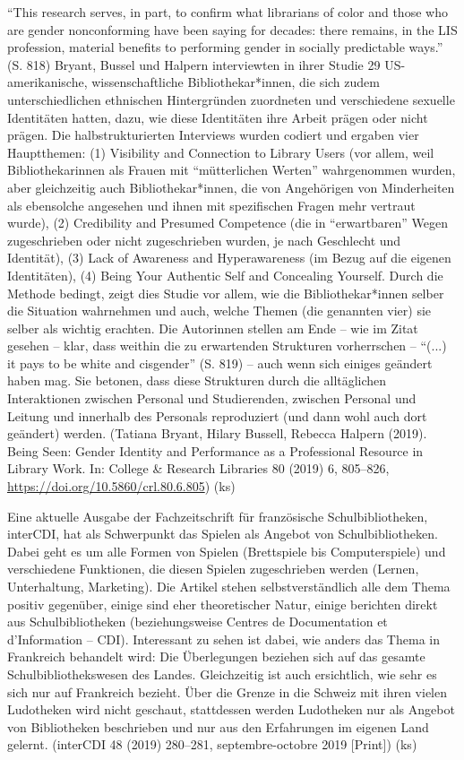 \documentclass[a4paper,
fontsize=11pt,
oneside,
numbers=noperiodatend,
parskip=half-,
bibliography=totoc,
final
]{scrartcl}
\begin{document}
\enquote{This research serves, in part, to confirm what librarians of
color and those who are gender nonconforming have been saying for
decades: there remains, in the LIS profession, material benefits to
performing gender in socially predictable ways.} (S. 818) Bryant, Bussel
und Halpern interviewten in ihrer Studie 29 US-amerikanische,
wissenschaftliche Bibliothekar*innen, die sich zudem unterschiedlichen
ethnischen Hintergründen zuordneten und verschiedene sexuelle
Identitäten hatten, dazu, wie diese Identitäten ihre Arbeit prägen oder
nicht prägen. Die halbstrukturierten Interviews wurden codiert und
ergaben vier Hauptthemen: (1) Visibility and Connection to Library Users
(vor allem, weil Bibliothekarinnen als Frauen mit \enquote{mütterlichen
Werten} wahrgenommen wurden, aber gleichzeitig auch Bibliothekar*innen,
die von Angehörigen von Minderheiten als ebensolche angesehen und ihnen
mit spezifischen Fragen mehr vertraut wurde), (2) Credibility and
Presumed Competence (die in \enquote{erwartbaren} Wegen zugeschrieben
oder nicht zugeschrieben wurden, je nach Geschlecht und Identität), (3)
Lack of Awareness and Hyperawareness (im Bezug auf die eigenen
Identitäten), (4) Being Your Authentic Self and Concealing Yourself.
Durch die Methode bedingt, zeigt dies Studie vor allem, wie die
Bibliothekar*innen selber die Situation wahrnehmen und auch, welche
Themen (die genannten vier) sie selber als wichtig erachten. Die
Autorinnen stellen am Ende -- wie im Zitat gesehen -- klar, dass weithin
die zu erwartenden Strukturen vorherrschen -- \enquote{(...) it pays to
be white and cisgender} (S. 819) -- auch wenn sich einiges geändert
haben mag. Sie betonen, dass diese Strukturen durch die alltäglichen
Interaktionen zwischen Personal und Studierenden, zwischen Personal und
Leitung und innerhalb des Personals reproduziert (und dann wohl auch
dort geändert) werden. (Tatiana Bryant, Hilary Bussell, Rebecca Halpern
(2019). Being Seen: Gender Identity and Performance as a Professional
Resource in Library Work. In: College \& Research Libraries 80 (2019) 6,
805--826, \url{https://doi.org/10.5860/crl.80.6.805}) (ks)

Eine aktuelle Ausgabe der Fachzeitschrift für französische
Schulbibliotheken, interCDI, hat als Schwerpunkt das Spielen als Angebot
von Schulbibliotheken. Dabei geht es um alle Formen von Spielen
(Brettspiele bis Computerspiele) und verschiedene Funktionen, die diesen
Spielen zugeschrieben werden (Lernen, Unterhaltung, Marketing). Die
Artikel stehen selbstverständlich alle dem Thema positiv gegenüber,
einige sind eher theoretischer Natur, einige berichten direkt aus
Schulbibliotheken (beziehungsweise Centres de Documentation et
d'Information -- CDI). Interessant zu sehen ist dabei, wie anders das
Thema in Frankreich behandelt wird: Die Überlegungen beziehen sich auf
das gesamte Schulbibliothekswesen des Landes. Gleichzeitig ist auch
ersichtlich, wie sehr es sich nur auf Frankreich bezieht. Über die
Grenze in die Schweiz mit ihren vielen Ludotheken wird nicht geschaut,
stattdessen werden Ludotheken nur als Angebot von Bibliotheken
beschrieben und nur aus den Erfahrungen im eigenen Land gelernt.
(interCDI 48 (2019) 280--281, septembre-octobre 2019 {[}Print{]}) (ks)
\end{document}
